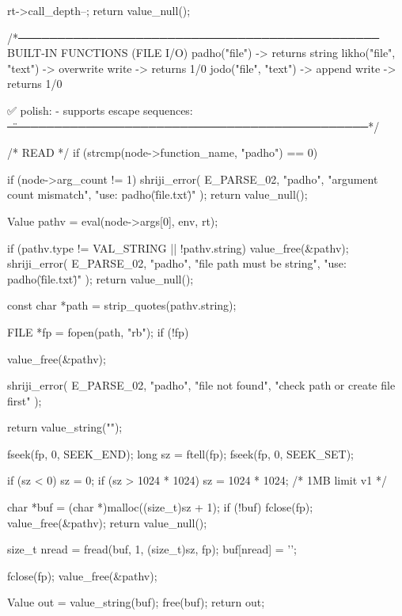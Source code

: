 \documentclass{article}
\begin{document}
{{{{    rt->call_depth--;
    return value_null();
}

   /*──────────────────────────────────────────────
      BUILT-IN FUNCTIONS (FILE I/O)
      padho("file")                -> returns string
      likho("file", "text")        -> overwrite write -> returns 1/0
      jodo("file", "text")         -> append write   -> returns 1/0

      ✅ polish:
      - supports escape sequences: \n \t \r \\ \"
    ──────────────────────────────────────────────*/

    /* READ */
    if (strcmp(node->function_name, "padho") == 0) {

        if (node->arg_count != 1) {
            shriji_error(
                E_PARSE_02,
                "padho",
                "argument count mismatch",
                "use: padho(\"file.txt\")"
            );
            return value_null();
        }

        Value pathv = eval(node->args[0], env, rt);

        if (pathv.type != VAL_STRING || !pathv.string) {
            value_free(&pathv);
            shriji_error(
                E_PARSE_02,
                "padho",
                "file path must be string",
                "use: padho(\"file.txt\")"
            );
            return value_null();
        }

        const char *path = strip_quotes(pathv.string);

FILE *fp = fopen(path, "rb");
if (!fp) {
    value_free(&pathv);

    shriji_error(
        E_PARSE_02,
        "padho",
        "file not found",
        "check path or create file first"
    );

    return value_string("");
}
        fseek(fp, 0, SEEK_END);
        long sz = ftell(fp);
        fseek(fp, 0, SEEK_SET);

        if (sz < 0) sz = 0;
        if (sz > 1024 * 1024) sz = 1024 * 1024; /* 1MB limit v1 */

        char *buf = (char *)malloc((size_t)sz + 1);
        if (!buf) {
            fclose(fp);
            value_free(&pathv);
            return value_null();
        }

        size_t nread = fread(buf, 1, (size_t)sz, fp);
        buf[nread] = '\0';

        fclose(fp);
        value_free(&pathv);

        Value out = value_string(buf);
        free(buf);
        return out;
    }

}}}
\end{document}
